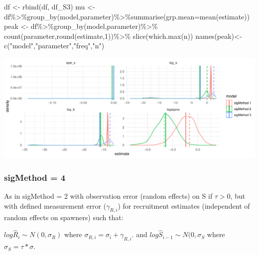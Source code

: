 \documentclass[
]{article}
\newenvironment{Shaded}{\begin{snugshade}}{\end{snugshade}}
\newcommand{\AttributeTok}[1]{\textcolor[rgb]{0.77,0.63,0.00}{#1}}
\newcommand{\DecValTok}[1]{\textcolor[rgb]{0.00,0.00,0.81}{#1}}
\newcommand{\FunctionTok}[1]{\textcolor[rgb]{0.00,0.00,0.00}{#1}}
\newcommand{\NormalTok}[1]{#1}
\newcommand{\OtherTok}[1]{\textcolor[rgb]{0.56,0.35,0.01}{#1}}
\newcommand{\SpecialCharTok}[1]{\textcolor[rgb]{0.00,0.00,0.00}{#1}}
\newcommand{\StringTok}[1]{\textcolor[rgb]{0.31,0.60,0.02}{#1}}
\begin{document}
\begin{Shaded}
\begin{Highlighting}[]
\NormalTok{  df }\OtherTok{\textless{}{-}} \FunctionTok{rbind}\NormalTok{(df, df\_S3)}
\NormalTok{  mu   }\OtherTok{\textless{}{-}}\NormalTok{ df}\SpecialCharTok{\%\textgreater{}\%}\FunctionTok{group\_by}\NormalTok{(model,parameter)}\SpecialCharTok{\%\textgreater{}\%}\FunctionTok{summarise}\NormalTok{(}\AttributeTok{grp.mean=}\FunctionTok{mean}\NormalTok{(estimate))}
\NormalTok{  peak }\OtherTok{\textless{}{-}}\NormalTok{ df}\SpecialCharTok{\%\textgreater{}\%}\FunctionTok{group\_by}\NormalTok{(model,parameter)}\SpecialCharTok{\%\textgreater{}\%}
    \FunctionTok{count}\NormalTok{(parameter,}\FunctionTok{round}\NormalTok{(estimate,}\DecValTok{1}\NormalTok{))}\SpecialCharTok{\%\textgreater{}\%}
    \FunctionTok{slice}\NormalTok{(}\FunctionTok{which.max}\NormalTok{(n))}
  \FunctionTok{names}\NormalTok{(peak)}\OtherTok{\textless{}{-}} \FunctionTok{c}\NormalTok{(}\StringTok{"model"}\NormalTok{,}\StringTok{"parameter"}\NormalTok{,}\StringTok{"freq"}\NormalTok{,}\StringTok{"n"}\NormalTok{)}
\end{Highlighting}
\end{Shaded}

\includegraphics{futR_demo_files/figure-latex/plot3-1.pdf}

\hypertarget{sigmethod-4-1}{%
\subsubsection{sigMethod = 4}\label{sigmethod-4-1}}

As in sigMethod = 2 with observation error (random effects) on S if
\(\tau >0\), but with defined measurement error (\(\gamma_{R,i}\)) for
recruitment estimates (independent of random effects on spawners) such
that:

\(log\hat{R}_i\sim N(0,\sigma_R)\) where
\(\sigma_{R,i}=\sigma_i+\gamma_{R,i}\). and
\(log\hat{S}_{i-1} \sim N(0,\sigma_S\) where \(\sigma_S=\tau*\sigma\).
\end{document}
